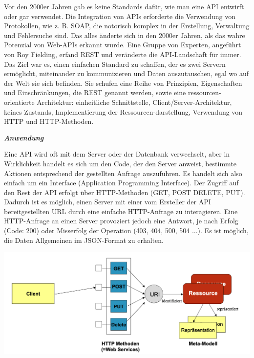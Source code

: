 Vor den 2000er Jahren gab es keine Standards dafür, wie man eine API entwirft oder gar verwendet. Die Integration von APIs erforderte die Verwendung von Protokollen, wie z. B. SOAP, die notorisch komplex in der Erstellung, Verwaltung und Fehlersuche sind. Das alles änderte sich in den 2000er Jahren, als das wahre Potenzial von Web-APIs erkannt wurde. Eine Gruppe von Experten, angeführt von Roy Fielding, erfand REST und veränderte die API-Landschaft für immer.
Das Ziel war es, einen einfachen Standard zu schaffen, der es zwei Servern ermöglicht, miteinander zu kommunizieren und Daten auszutauschen, egal wo auf der Welt sie sich befinden. Sie schufen eine Reihe von Prinzipien, Eigenschaften und Einschränkungen, die REST genannt werden, sowie eine ressourcen-orientierte Architektur: einheitliche Schnittstelle, Client/Server-Architektur, keines Zustands, Implementierung der Ressourcen-darstellung, Verwendung von HTTP und HTTP-Methoden.

\textit{\textbf{Anwendung}}

Eine API wird oft mit dem Server oder der Datenbank verwechselt, aber in Wirklichkeit handelt es sich um den Code, der den Server anweist, bestimmte Aktionen entsprechend der gestellten Anfrage auszuführen. Es handelt sich also einfach um ein Interface (Application Programming Interface).
Der Zugriff auf den Rest der API erfolgt über HTTP-Methoden (GET, POST DELETE, PUT). Dadurch ist es möglich, einen Server mit einer vom Ersteller der API bereitgestellten URL durch eine einfache HTTP-Anfrage zu interagieren. Eine HTTP-Anfrage an einen Server provoziert jedoch eine Antwort, je nach Erfolg (Code: 200) oder Misserfolg der Operation (403, 404, 500, 504 ...). Es ist möglich, die Daten Allgemeinen im JSON-Format zu erhalten.

\begin{center}
\includegraphics[scale=.3]{images/Aufbau_eine REST-basierten_Web_Services_Architektur}
\end{center}


